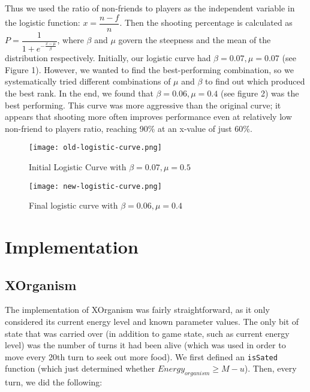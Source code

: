 \documentclass[
10pt, %
letterpaper, %
oneside, %
headinclude,footinclude, %
english
]{article}
\begin{document}
Thus we used the ratio of non-friends to players as the independent variable in the logistic function: $x = \dfrac{n - f}{n}$. Then the shooting percentage is calculated as $P = \dfrac{1}{1 + e^{-\frac{x - \mu}{\beta}}}$, where $\beta$ and $\mu$ govern the steepness and the mean of the distribution respectively. Initially, our logistic curve had $\beta=0.07,\mu=0.07$ (see Figure 1). However, we wanted to find the best-performing combination, so we systematically tried different combinations of $\mu$ and $\beta$ to find out which produced the best rank. In the end, we found that $\beta=0.06,\mu=0.4$ (see figure 2) was the best performing. This curve was more aggressive than the original curve; it appears that shooting more often improves performance even at relatively low non-friend to players ratio, reaching 90\% at an x-value of just 60\%.

\begin{figure}[h]
\centering
\texttt{[image: old-logistic-curve.png]}
\caption[Initial logistic curve with $\beta=0.07,\mu=0.5$]{Initial Logistic Curve with $\beta=0.07,\mu=0.5$}
\label{fig:gallery2}
\end{figure}

\begin{figure}[h]
\centering
\texttt{[image: new-logistic-curve.png]}
\caption[Final logistic curve with $\beta=0.06,\mu=0.4$]{Final logistic curve with $\beta=0.06,\mu=0.4$}
\label{fig:gallery3}
\end{figure}
\section{Implementation}

\subsection{XOrganism}

The implementation of XOrganism was fairly straightforward, as it only considered its current energy level and known parameter values. The only bit of state that was carried over (in addition to game state, such as current energy level) was the number of turns it had been alive (which was used in order to move every 20th turn to seek out more food). We first defined an \texttt{isSated} function (which just determined whether $Energy_{organism} \geq M - u$). Then, every turn, we did the following:
\end{document}
